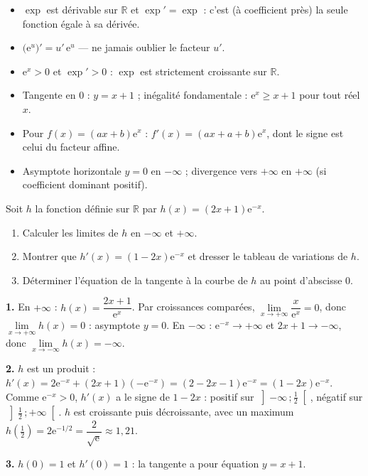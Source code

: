 \documentclass[11pt]{article}
\begin{document}
\begin{aretenir}
\begin{itemize}
\item $\exp$ est dérivable sur $\mathbb{R}$ et $\exp' = \exp$ : c'est (à coefficient près) la seule fonction égale à sa dérivée.
\item $\big(\mathrm{e}^{u}\big)' = u'\,\mathrm{e}^{u}$ — ne jamais oublier le facteur $u'$.
\item $\mathrm{e}^x > 0$ et $\exp' > 0$ : $\exp$ est strictement croissante sur $\mathbb{R}$.
\item Tangente en $0$ : $y = x + 1$ ; inégalité fondamentale : $\mathrm{e}^x \geq x + 1$ pour tout réel $x$.
\item Pour $f(x) = (ax+b)\mathrm{e}^x$ : $f'(x) = (ax + a + b)\mathrm{e}^x$, dont le signe est celui du facteur affine.
\item Asymptote horizontale $y = 0$ en $-\infty$ ; divergence vers $+\infty$ en $+\infty$ (si coefficient dominant positif).
\end{itemize}
\end{aretenir}

\begin{exercice}
Soit $h$ la fonction définie sur $\mathbb{R}$ par $h(x) = (2x + 1)\mathrm{e}^{-x}$.
\begin{enumerate}
\item Calculer les limites de $h$ en $-\infty$ et $+\infty$.
\item Montrer que $h'(x) = (1 - 2x)\mathrm{e}^{-x}$ et dresser le tableau de variations de $h$.
\item Déterminer l'équation de la tangente à la courbe de $h$ au point d'abscisse $0$.
\end{enumerate}
\end{exercice}

\begin{corrige}[Exercice 1]
\textbf{1.} En $+\infty$ : $h(x) = \dfrac{2x+1}{\mathrm{e}^{x}}$. Par croissances comparées, $\lim\limits_{x \to +\infty}\dfrac{x}{\mathrm{e}^x} = 0$, donc $\lim\limits_{x \to +\infty} h(x) = 0$ : asymptote $y = 0$. En $-\infty$ : $\mathrm{e}^{-x} \to +\infty$ et $2x+1 \to -\infty$, donc $\lim\limits_{x \to -\infty} h(x) = -\infty$.

\textbf{2.} $h$ est un produit : $h'(x) = 2\mathrm{e}^{-x} + (2x+1)(-\mathrm{e}^{-x}) = (2 - 2x - 1)\mathrm{e}^{-x} = (1 - 2x)\mathrm{e}^{-x}$. Comme $\mathrm{e}^{-x} > 0$, $h'(x)$ a le signe de $1 - 2x$ : positif sur $\left]-\infty\,;\tfrac{1}{2}\right[$, négatif sur $\left]\tfrac{1}{2}\,;+\infty\right[$. $h$ est croissante puis décroissante, avec un maximum $h\left(\tfrac{1}{2}\right) = 2\mathrm{e}^{-1/2} = \dfrac{2}{\sqrt{\mathrm{e}}} \approx 1{,}21$.

\textbf{3.} $h(0) = 1$ et $h'(0) = 1$ : la tangente a pour équation $y = x + 1$.
\end{corrige}
\end{document}
